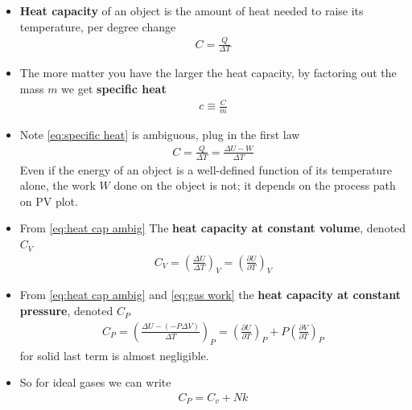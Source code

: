 \documentclass{book}
\begin{document}
\begin{itemize}
	\item \textbf{Heat capacity} of an object is the amount of heat needed to raise its temperature,
	      per degree change
	      \begin{align}
		      \label{eq:heat capacity}
		      C = \frac{Q}{\Delta{T}}
	      \end{align}
	\item The more matter you have the larger the heat capacity, by factoring out the mass $m$
	      we get \textbf{specific heat}
	      \begin{align}
		      \label{eq:specific heat}
		      c \equiv \frac{C}{m}
	      \end{align}
	\item Note \eqref{eq:specific heat} is ambiguous, plug in the first law
	      \begin{align}
		      \label{eq:heat cap ambig}
		      C = \frac{Q}{\Delta{T}} = \frac{\Delta{U} - W}{\Delta{T}}
	      \end{align}
	      Even if the energy of an object is a well-defined function of its temperature alone,
	      the work $W$ done on the object is not; it depends on the process path on PV plot.
	\item From \eqref{eq:heat cap ambig} The \textbf{heat capacity at constant volume}, denoted $C_{V}$
	      \begin{align}
		      \label{eq:heat cap v}
		      C_{V} = {\left( \frac{\Delta{U}}{\Delta{T}} \right)}_{V} =
		      \left( \frac{\partial U}{\partial T} \right)_{V}
	      \end{align}
	\item From \eqref{eq:heat cap ambig} and \eqref{eq:gas work}
	      the \textbf{heat capacity at constant pressure}, denoted $C_{P}$
	      \begin{align}
		      \label{eq:heat cap p}
		      C_{P} = \left( \frac{\Delta{U} - (- P \Delta{V})}{\Delta{T}}  \right)_{P}
		      = \left ( \frac{\partial U}{\partial T}  \right)_{P}
		      + P \left ( \frac{\partial V}{\partial T}  \right)_{P}
	      \end{align}
	      for solid last term is almost negligible.
	\item So for ideal gases we can write
	      \begin{align}
		      C_P = C_v + Nk
	      \end{align}


\end{itemize}
\end{document}
